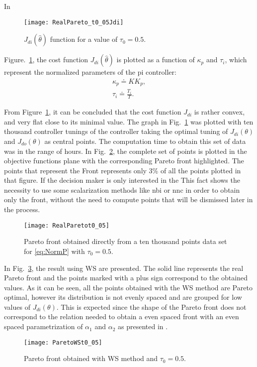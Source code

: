 In %
\begin{figure}[tb]%
	\centering
	\texttt{[image: RealPareto\_t0\_05Jdi]}%
	\caption{$J_{di}(\hat{\theta})$ function for a value of $\tau_0=0.5$.}%
	\label{fig:RealPareto_t0_05Jdi}%
\end{figure}
%
%
Figure.~\ref{fig:RealPareto_t0_05Jdi}, the cost function $J_{di}(\hat{\theta})$ is plotted as a function of $\kappa_p$ and $\tau_i$, which represent the normalized parameters of the \gls{pi} controller:
\begin{equation}
\begin{array}{c}
\kappa_p \doteq K K_p,\\
\tau_i \doteq \frac{T_i}{T}.
\end{array}
\label{eq:NormContrParam}
\end{equation}

From Figure~\ref{fig:RealPareto_t0_05Jdi}, it can be concluded that the cost function $J_{di}$ is rather convex, and very flat close to its minimal value. The graph in Fig.~\ref{fig:RealPareto_t0_05Jdi} was plotted with ten thousand controller tunings of the controller taking the optimal tuning of $J_{di}(\theta)$ and $J_{do}(\theta)$ as central points. The computation time to obtain this set of data was in the range of hours. In Fig.~\ref{fig:RealParetot0_05}, the complete set of points is plotted in the objective functions plane with the corresponding Pareto front highlighted. The points that represent the Front represents only 3\% of all the points plotted in that figure. If the decision maker is only interested in the  This fact shows the necessity to use some scalarization methods like \gls{nbi} or \gls{nnc} in order to obtain only the front, without the need to compute points that will be dismissed later in the process.
%
\begin{figure}[tb]%
\centering
\texttt{[image: RealParetot0\_05]} %
\caption{Pareto front obtained directly from a ten thousand points data set for \eqref{eq:NormP} with $\tau_0=0.5$.}%
\label{fig:RealParetot0_05}%
\end{figure}

In Fig.~\ref{fig:ParetoWSt0_05}, the result using WS are presented. The solid line represents the real Pareto front and the points marked with a plus sign correspond to the obtained values. As it can be seen, all the points obtained with the WS method are Pareto optimal, however its distribution is not evenly spaced and are grouped for low values of $J_{di}(\theta)$. This is expected since the shape of the Pareto front does not correspond to the relation needed to obtain a even spaced front with an even spaced parametrization of $\alpha_1$ and $\alpha_2$ as presented in \cite{Das1997}.
%
\begin{figure}[tb]%
\centering
\texttt{[image: ParetoWSt0\_05]}%
\caption{Pareto front obtained with WS method and $\tau_0=0.5$.}%
\label{fig:ParetoWSt0_05}%
\end{figure}


